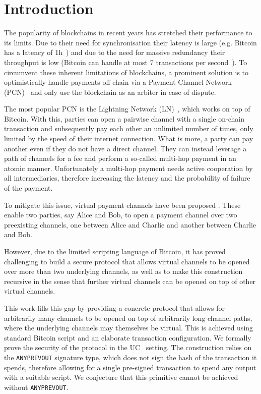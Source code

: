 \section{Introduction}
  The popularity of blockchains in recent years has stretched their
  performance to its limits. Due to their need for synchronisation their latency
  is large (e.g. Bitcoin has a latency of 1h~\cite{bitcoin}) and due to the need
  for massive redundancy their throughput is low (Bitcoin can handle at most 7
  transactions per second~\cite{scaling}). To circumvent these inherent
  limitations of blockchains, a prominent solution is to optimistically handle
  payments off-chain via a Payment Channel Network
  (PCN)~\cite{DBLP:conf/fc/GudgeonMRMG20} and only use the blockchain as an
  arbiter in case of dispute.

  The most popular PCN is the Lightning Network (LN)~\cite{lightning}, which
  works on top of Bitcoin. With this, parties can open a pairwise channel with a
  single on-chain transaction and subsequently pay each other an unlimited
  number of times, only limited by the speed of their internet connection. What
  is more, a party can pay another even if they do not have a direct channel.
  They can instead leverage a path of channels for a fee and perform a so-called
  multi-hop payment in an atomic manner. Unfortunately a multi-hop payment needs
  active cooperation by all intermediaries, therefore increasing the latency and
  the probability of failure of the payment.

  To mitigate this issue, virtual payment channels have been proposed
  . These enable two parties, say Alice and Bob, to open a payment
  channel over two preexisting channels, one between Alice and Charlie and
  another between Charlie and Bob. 

  However, due to the limited scripting language of Bitcoin, it has proved
  challenging to build a secure protocol that allows virtual channels to be
  opened over more than two underlying channels,  as well as to make this
  construction recursive in the sense that further virtual channels can be
  opened on top of other virtual channels.

  This work fills this gap by providing a concrete protocol that allows for
  arbitrarily many channels to be opened on top of arbitrarily long channel
  paths, where the underlying channels may themselves be virtual. This is
  achieved using standard Bitcoin script and an elaborate transaction
  configuration. We formally prove the security of the protocol in the
  UC~\cite{uc} setting. The construction relies on the \texttt{ANYPREVOUT}
  signature type, which does not sign the hash of the transaction it spends,
  therefore allowing for a single pre-signed transaction to spend any output
  with a suitable script. We conjecture that this primitive cannot be achieved
  without \texttt{ANYPREVOUT}.
